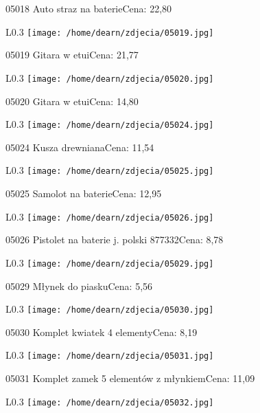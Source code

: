 05018 Auto straz na baterieCena: 22,80\newline
\begin{wrapfigure}{L}{0.3\textwidth}
\texttt{[image: /home/dearn/zdjecia/05019.jpg]}
\end{wrapfigure}
05019 Gitara w etuiCena: 21,77\newline
\begin{wrapfigure}{L}{0.3\textwidth}
\texttt{[image: /home/dearn/zdjecia/05020.jpg]}
\end{wrapfigure}
05020 Gitara w etuiCena: 14,80\newline
\begin{wrapfigure}{L}{0.3\textwidth}
\texttt{[image: /home/dearn/zdjecia/05024.jpg]}
\end{wrapfigure}
05024 Kusza drewnianaCena: 11,54\newline
\begin{wrapfigure}{L}{0.3\textwidth}
\texttt{[image: /home/dearn/zdjecia/05025.jpg]}
\end{wrapfigure}
05025 Samolot na baterieCena: 12,95\newline
\begin{wrapfigure}{L}{0.3\textwidth}
\texttt{[image: /home/dearn/zdjecia/05026.jpg]}
\end{wrapfigure}
05026 Pistolet na baterie j. polski 877332Cena: 8,78\newline
\begin{wrapfigure}{L}{0.3\textwidth}
\texttt{[image: /home/dearn/zdjecia/05029.jpg]}
\end{wrapfigure}
05029 Młynek do piaskuCena: 5,56\newline
\begin{wrapfigure}{L}{0.3\textwidth}
\texttt{[image: /home/dearn/zdjecia/05030.jpg]}
\end{wrapfigure}
05030 Komplet kwiatek 4 elementyCena: 8,19\newline
\begin{wrapfigure}{L}{0.3\textwidth}
\texttt{[image: /home/dearn/zdjecia/05031.jpg]}
\end{wrapfigure}
05031 Komplet zamek 5 elementów z młynkiemCena: 11,09\newline
\begin{wrapfigure}{L}{0.3\textwidth}
\texttt{[image: /home/dearn/zdjecia/05032.jpg]}
\end{wrapfigure}
